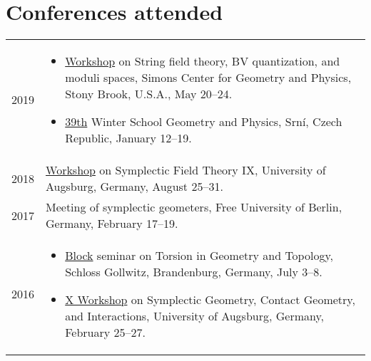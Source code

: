 \documentclass[a4paper,12pt]{article}
\begin{document}
\section*{Conferences attended}

\begingroup
\def\arraystretch{2}
\def\minpagewidthCA{.92\textwidth}
\begin{tabularx}{\textwidth}{@{}lX@{}}

2019 & \begin{minipage}[t]{\minpagewidthCA}
\begin{itemize}[leftmargin=*,itemsep=-1ex]
\item \href{http://scgp.stonybrook.edu/archives/25214}{Workshop} on String field theory, BV quantization, and moduli spaces, Simons Center for Geometry and Physics, Stony Brook, U.S.A., May 20--24.
\item \href{http://conference.math.muni.cz/srni/}{39th} Winter School Geometry and Physics, Srn\'i, Czech Republic, January 12--19.
\end{itemize}
\end{minipage}\\

2018 & \begin{minipage}[t]{\minpagewidthCA} 
\href{https://www.math.uni-augsburg.de/prof/geo/SFTIX/}{Workshop} on Symplectic Field Theory IX, University of Augsburg, Germany, August 25--31.
\end{minipage}\\

2017 & \begin{minipage}[t]{\minpagewidthCA} 
Meeting of symplectic geometers, Free University of Berlin, Germany, February 17--19.
\end{minipage}  \\

2016 & \begin{minipage}[t]{\minpagewidthCA}
\begin{itemize}[leftmargin=*,itemsep=-1ex]
\item \href{https://www.math.uni-potsdam.de/professuren/geometrie/lehre/blockseminare/2016-brandenburg/}{Block} seminar on  Torsion in Geometry and Topology, Schloss Gollwitz, Brandenburg, Germany, July 3--8.
\item \href{https://www.math.uni-augsburg.de/prof/geo/Cast2016/}{X Workshop} on Symplectic Geometry, Contact Geometry, and Interactions, University of Augsburg, Germany, February 25--27. 
\end{itemize}\end{minipage}\\


\end{tabularx}
\end{document}
